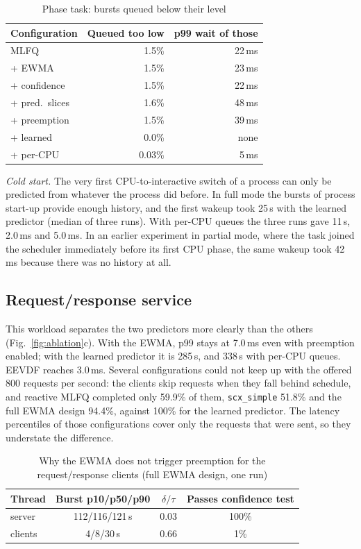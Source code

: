 \documentclass[conference]{IEEEtran}
\newcommand{\us}{\,\textmu{}s}
\newcommand{\ms}{\,ms}
\newcommand{\code}[1]{\texttt{\small #1}}
\begin{document}
\begin{table}[t]
\caption{Phase task: bursts queued below their level}
\label{tab:misplace}
\centering
\footnotesize
\begin{tabular}{@{}lrr@{}}
\toprule
Configuration & Queued too low & p99 wait of those \\
\midrule
MLFQ & 1.5\% & 22\ms \\
+ EWMA & 1.5\% & 23\ms \\
+ confidence & 1.5\% & 22\ms \\
+ pred.\ slices & 1.6\% & 48\ms \\
+ preemption & 1.5\% & 39\ms \\
+ learned & 0.0\% & none \\
+ per-CPU & 0.03\% & 5\ms \\
\bottomrule
\end{tabular}
\end{table}

\emph{Cold start.} The very first CPU-to-interactive switch of a process can only be predicted
from whatever the process did before. In full mode the bursts of process start-up provide enough
history, and the first wakeup took 25\us{} with the learned predictor (median of three runs).
With per-CPU queues the three runs gave 11\us, 2.0\ms{} and 5.0\ms. In an earlier experiment in
partial mode, where the task joined the scheduler immediately before its first CPU phase, the
same wakeup took 42\ms{} because there was no history at all.

\subsection{Request/response service}

This workload separates the two predictors more clearly than the others
(Fig.~\ref{fig:ablation}c). With the EWMA, p99 stays at 7.0\ms{} even with preemption enabled;
with the learned predictor it is 285\us, and 338\us{} with per-CPU queues. EEVDF reaches
3.0\ms. Several configurations could not keep up with the offered 800 requests per second: the
clients skip requests when they fall behind schedule, and reactive MLFQ completed only 59.9\% of
them, \code{scx\_simple} 51.8\% and the full EWMA design 94.4\%, against 100\% for the learned
predictor. The latency percentiles of those configurations cover only the requests that were
sent, so they understate the difference.

\begin{table}[t]
\caption{Why the EWMA does not trigger preemption for the request/response clients
(full EWMA design, one run)}
\label{tab:rr}
\centering
\footnotesize
\setlength{\tabcolsep}{3pt}
\begin{tabular}{@{}lccc@{}}
\toprule
Thread & Burst p10/p50/p90 & $\delta/\tau$ & Passes confidence test \\
\midrule
server & 112/116/121\us & 0.03 & 100\% \\
clients & 4/8/30\us & 0.66 & 1\% \\
\bottomrule
\end{tabular}
\end{table}
\end{document}
